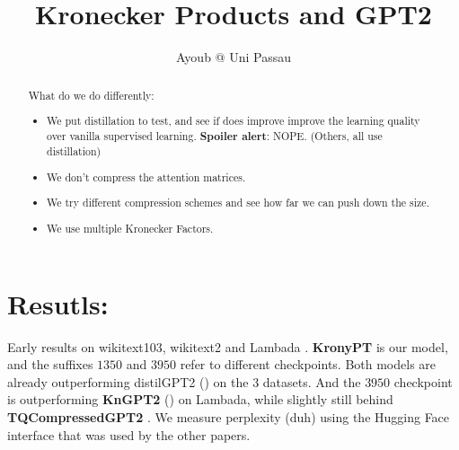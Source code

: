 \documentclass{article}
\title{Kronecker Products and GPT2}
\author{Ayoub @ Uni Passau}
\begin{document}
\maketitle

\begin{abstract}

What do we do differently:

\begin{itemize}
	\item We put distillation to test, and see if does improve improve the learning quality over vanilla supervised learning. \textbf{Spoiler alert}: NOPE. (Others, all use distillation)
	\item We don't compress the attention matrices.
	\item We try different compression schemes and see how far we can push down the size.
	\item We use multiple Kronecker Factors.
\end{itemize}

\end{abstract}

\newpage

\tableofcontents
\newpage

\section{Resutls:}%
\label{sec:Resutls}

Early results on wikitext103, wikitext2 \cite{merity2016pointer} and Lambada \cite{paperno2016lambada}. \textbf{KronyPT} is our model, and the suffixes $1350$ and $3950$ refer to different checkpoints. Both models are already outperforming distilGPT2 (\cite{sanh2019distilbert}) on the 3 datasets. And the $3950$ checkpoint is outperforming \textbf{KnGPT2} (\cite{tahaei2022kroneckerbert}) on Lambada, while slightly still behind \textbf{TQCompressedGPT2}  \cite{abronin2024tqcompressor}. We measure perplexity (duh) using the Hugging Face interface that was used by the other papers.
\end{document}
